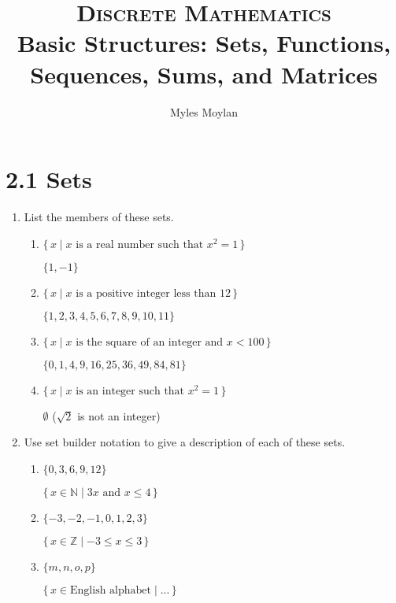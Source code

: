 \documentclass[11pt]{article}
\title{	
	\normalfont \normalsize 
	\textsc{Discrete Mathematics} \\
	\huge Basic Structures: Sets, Functions, Sequences, Sums, and Matrices \\
}
\author{Myles Moylan} %
\date{} %
\begin{document}
	
\maketitle

\section*{\textbf{2.1 Sets}}
\begin{enumerate}[label=\textbf{\arabic*.}]
	\item List the members of these sets.
	
	\begin{enumerate}[label=\textbf{\alph*)}]
		\item $\{\,x \mid x \text{ is a real number such that } x^2 = 1\,\}$
		
		$\{1, -1\}$
		
		\item $\{\,x \mid x \text{ is a positive integer less than } 12\,\}$
		
		$\{1, 2, 3, 4, 5, 6, 7, 8, 9, 10, 11\}$
		
		\item $\{\,x \mid x \text{ is the square of an integer and } x < 100\,\}$
		
		$\{0, 1, 4, 9, 16, 25, 36, 49, 84, 81\}$
		
		\item $\{\,x \mid x \text{ is an integer such that } x^2 = 1\,\}$
		
		$\emptyset$ ($\sqrt{2}$ is not an integer)
	\end{enumerate}

	\item Use set builder notation to give a description of each of these sets.
	
	\begin{enumerate}[label=\textbf{\alph*)}]
		\item $\{0, 3, 6, 9, 12\}$
		
		$\{\,x \in \mathbb{N} \mid 3x \text{ and } x \leq 4\,\}$
		
		\item $\{-3, -2, -1, 0, 1, 2, 3\}$
		
		$\{\,x \in \mathbb{Z} \mid -3 \leq x \leq 3\,\}$
		
		\item $\{m, n, o, p\}$
		
		$\{\,x \in \text{English alphabet} \mid  ...\,\}$
	\end{enumerate}


\end{enumerate}
\end{document}

